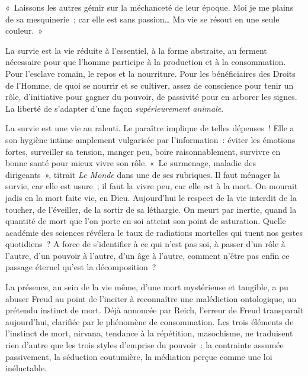 \documentclass[french,twoside]{book} %
\newenvironment{quoteblock}%
  {\begin{quoting}}
  {\end{quoting}}
\newenvironment{quotebar}{%
    \def\FrameCommand{{\color{rubric!10!}\vrule width 0.5em} \hspace{0.9em}}%
    \def\OuterFrameSep{\itemsep} %
    \MakeFramed {\advance\hsize-\width \FrameRestore}
  }%
  {%
    \endMakeFramed
  }
\renewenvironment{quoteblock}%
  {%
    \savenotes
    \setstretch{0.9}
    \normalfont
    \begin{quotebar}
  }
  {%
    \end{quotebar}
    \spewnotes
  }
\begin{document}
\begin{quoteblock}
\noindent « Laissons les autres gémir sur la méchanceté de leur époque. Moi je me plains de sa mesquinerie ; car elle est sans passion… Ma vie se résout en une seule couleur. »\end{quoteblock}

\noindent La survie est la vie réduite à l’essentiel, à la forme abstraite, au ferment nécessaire pour que l’homme participe à la production et à la consommation. Pour l’esclave romain, le repos et la nourriture. Pour les bénéficiaires des Droits de l’Homme, de quoi se nourrir et se cultiver, assez de conscience pour tenir un rôle, d’initiative pour gagner du pouvoir, de passivité pour en arborer les signes. La liberté de s’adapter d’une façon \emph{supérieurement animale}.\par
La survie est une vie au ralenti. Le paraître implique de telles dépenses ! Elle a son hygiène intime amplement vulgarisée par l’information : éviter les émotions fortes, surveiller sa tension, manger peu, boire raisonnablement, survivre en bonne santé pour mieux vivre son rôle. « Le surmenage, maladie des dirigeants », titrait \emph{Le Monde} dans une de ses rubriques. Il faut ménager la survie, car elle est usure ; il faut la vivre peu, car elle est à la mort. On mourait jadis en la mort faite vie, en Dieu. Aujourd’hui le respect de la vie interdit de la toucher, de l’éveiller, de la sortir de sa léthargie. On meurt par inertie, quand la quantité de mort que l’on porte en soi atteint son point de saturation. Quelle académie des sciences révélera le taux de radiations mortelles qui tuent nos gestes quotidiens ? A force de s’identifier à ce qui n’est pas soi, à passer d’un rôle à l’autre, d’un pouvoir à l’autre, d’un âge à l’autre, comment n’être pas enfin ce passage éternel qu’est la décomposition ?\par
La présence, au sein de la vie même, d’une mort mystérieuse et tangible, a pu abuser Freud au point de l’inciter à reconnaître une malédiction ontologique, un prétendu instinct de mort. Déjà annoncée par Reich, l’erreur de Freud transparaît aujourd’hui, clarifiée par le phénomène de consommation. Les trois éléments de l’instinct de mort, nirvana, tendance à la répétition, masochisme, ne traduisent rien d’autre que les trois styles d’emprise du pouvoir : la contrainte assumée passivement, la séduction coutumière, la médiation perçue comme une loi inéluctable.\par
\end{document}
